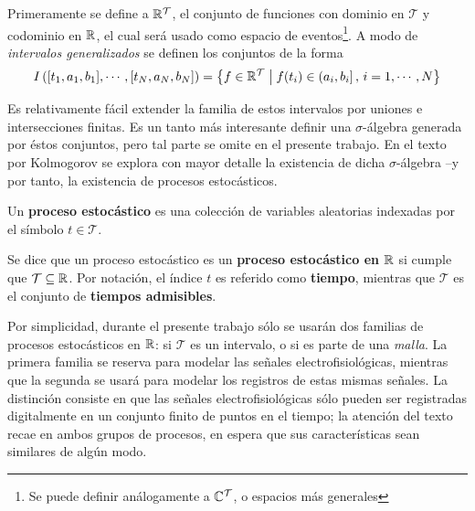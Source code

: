 Primeramente se define a $\mathbb{R}^{\mathcal{T}}$, el conjunto de funciones con dominio en $\mathcal{T}$ y codominio en $\mathbb{R}$, el cual será usado como espacio de eventos\footnote{Se puede definir análogamente a $\mathbb{C}^{\mathcal{T}}$, o espacios más generales}. 
%
A modo de \textit{intervalos generalizados} se definen los conjuntos de la forma
\begin{equation}
I\left( [t_1, a_1, b_1], \cdots, [t_N, a_N, b_N] \right) = 
\left\{ f \in \mathbb{R}^{\mathcal{T}} \mathrel{}\middle|\mathrel{} f(t_i) \in (a_i, b_i] \, , \, i = 1, \cdots, N \right\}
\end{equation}

Es relativamente fácil extender la familia de estos intervalos por uniones e intersecciones finitas. Es un tanto más interesante definir una $\sigma$-álgebra generada por éstos conjuntos, pero tal parte se omite en el presente trabajo.
%
En el texto por Kolmogorov se explora con mayor detalle la existencia de dicha $\sigma$-álgebra --y por tanto, la existencia de procesos estocásticos.



\begin{definicion}
Un \textbf{proceso estocástico} \xt es una colección de variables aleatorias indexadas por el símbolo $t\in\mathcal{T}$.
\end{definicion}

\begin{definicion}
Se dice que un proceso estocástico \xt es un \textbf{proceso estocástico en $\mathbb{R}$} si cumple que $\mathcal{T} \subseteq \mathbb{R}$.
%
Por notación, el índice $t$ es referido como \textbf{tiempo}, mientras que $\mathcal{T}$ es el conjunto de \textbf{tiempos admisibles}.
\end{definicion}

Por simplicidad, durante el presente trabajo sólo se usarán dos familias de procesos estocásticos en $\mathbb{R}$: si $\mathcal{T}$ es un intervalo, o si es parte de una \textit{malla}. 
%
La primera familia se reserva para modelar las señales electrofisiológicas, mientras que la segunda se usará para modelar los registros de estas mismas señales.
%
La distinción consiste en que las señales electrofisiológicas sólo pueden ser registradas digitalmente en un conjunto finito de puntos en el tiempo; la atención del texto recae en ambos grupos de procesos, en espera que sus características sean similares de algún modo.

